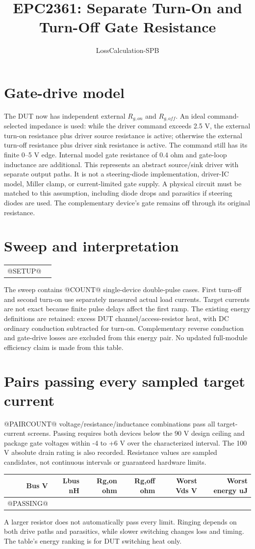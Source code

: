 \documentclass[a4paper,10pt]{article}
\title{EPC2361: Separate Turn-On and Turn-Off Gate Resistance}
\author{LossCalculation-SPB}
\begin{document}
\maketitle
\section{Gate-drive model}
The DUT now has independent external $R_{g,on}$ and $R_{g,off}$. An ideal
command-selected impedance is used: while the driver command exceeds 2.5 V,
the external turn-on resistance plus driver source resistance is active;
otherwise the external turn-off resistance plus driver sink resistance is active.
The command still has its finite 0--5 V edge. Internal model gate resistance
of 0.4 ohm and gate-loop inductance are additional.
This represents an abstract source/sink driver with separate output paths.
It is not a steering-diode implementation, driver-IC model, Miller clamp,
or current-limited gate supply. A physical circuit must be matched to this
assumption, including diode drops and parasitics if steering diodes are used.
The complementary device's gate remains off through its original resistance.
\section{Sweep and interpretation}
\begin{center}\begin{tabular}{ll}
@SETUP@
\end{tabular}\end{center}
The sweep contains @COUNT@ single-device double-pulse cases. First turn-off
and second turn-on use separately measured actual load currents. Target
currents are not exact because finite pulse delays affect the first ramp.
The existing energy definitions are retained: excess DUT channel/access-resistor
heat, with DC ordinary conduction subtracted for turn-on. Complementary reverse
conduction and gate-drive losses are excluded from this energy pair.
No updated full-module efficiency claim is made from this table.
\section{Pairs passing every sampled target current}
@PAIRCOUNT@ voltage/resistance/inductance combinations pass all target-current
screens. Passing requires both devices below the 90 V design ceiling and
package gate voltages within -4 to +6 V over the characterized interval.
The 100 V absolute drain rating is also recorded. Resistance values are
sampled candidates, not continuous intervals or guaranteed hardware limits.
\begin{center}\small\begin{tabular}{rrrrrr}
Bus V & Lbus nH & Rg,on ohm & Rg,off ohm & Worst Vds V & Worst energy uJ \\
\hline
@PASSING@
\end{tabular}\end{center}
A larger resistor does not automatically pass every limit. Ringing depends
on both drive paths and parasitics, while slower switching changes loss and
timing. The table's energy ranking is for DUT switching heat only.
\end{document}
